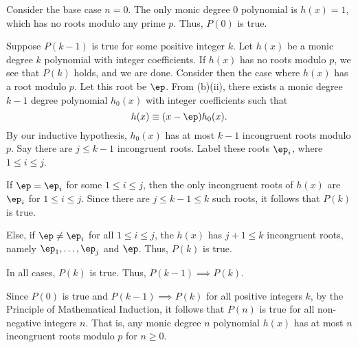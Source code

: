 \begin{solution}
\begin{ppart}
\begin{psubpart}
            Consider the base case $n = 0$. The only monic degree 0 polynomial is $h(x) = 1$, which has no roots modulo any prime $p$. Thus, $P(0)$ is true.

            Suppose $P(k-1)$ is true for some positive integer $k$. Let $h(x)$ be a monic degree $k$ polynomial with integer coefficients. If $h(x)$ has no roots modulo $p$, we see that $P(k)$ holds, and we are done. Consider then the case where $h(x)$ has a root modulo $p$. Let this root be $\ep$. From (b)(ii), there exists a monic degree $k-1$ degree polynomial $h_0(x)$ with integer coefficients such that \[h(x) \equiv (x-\ep) h_0(x).\] By our inductive hypothesis, $h_0(x)$ has at most $k-1$ incongruent roots modulo $p$. Say there are $j \leq k-1$ incongruent roots. Label these roots $\ep_i$, where $1 \leq i \leq j$.

            If $\ep = \ep_i$ for some $1 \leq i \leq j$, then the only incongruent roots of $h(x)$ are $\ep_i$ for $1 \leq i \leq j$. Since there are $j \leq k-1 \leq k$ such roots, it follows that $P(k)$ is true.

            Else, if $\ep \neq \ep_i$ for all $1 \leq i \leq j$, the $h(x)$ has $j+1 \leq k$ incongruent roots, namely $\ep_1, \dots, \ep_j$ and $\ep$. Thus, $P(k)$ is true.

            In all cases, $P(k)$ is true. Thus, $P(k-1) \implies P(k)$.

            Since $P(0)$ is true and $P(k-1) \implies P(k)$ for all positive integers $k$, by the Principle of Mathematical Induction, it follows that $P(n)$ is true for all non-negative integers $n$. That is, any monic degree $n$ polynomial $h(x)$ has at most $n$ incongruent roots modulo $p$ for $n \geq 0$.
        \end{psubpart}
    \end{ppart}
\end{solution}

